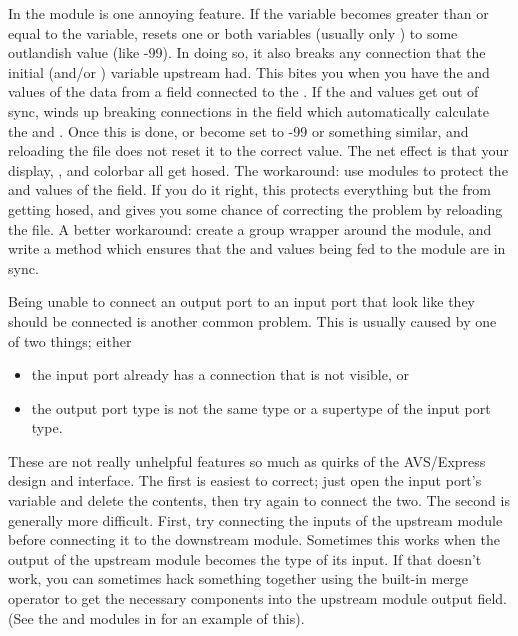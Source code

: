 In the  module is one annoying feature.  If the 
variable becomes greater than or equal to the  variable,
 resets one or both variables (usually only ) to some
outlandish value (like -99).  In doing so, it also breaks any connection that
the initial  (and/or ) variable upstream had.  This bites
you when you have the  and  values of the data from a
field connected to the .  If the  and 
values get out of sync,  winds up breaking connections in the
field which automatically calculate the  and .  Once this
is done,  or  become set to -99 or something similar, and
reloading the \parflow{} file does not reset it to the correct value.  The net
effect is that your display, , and colorbar all get hosed.  The
workaround:  use  modules to protect the  and
 values of the field.  If you do it right, this protects everything
but the  from getting hosed, and gives you some chance of
correcting the problem by reloading the \parflow{} file.  A better workaround:
create a group wrapper around the  module, and write a method
which ensures that the  and  values being fed to the
 module are in sync.

Being unable to connect an output port to an input port that look like they
should be connected is another common problem.  This is usually caused by one
of two things; either
\begin{itemize}
\item the input port already has a connection that is not visible, or
\item the output port type is not the same type or a supertype of the input port type.
\end{itemize}
These are not really unhelpful features so much as quirks of the AVS/Express
design and interface.  The first is easiest to correct; just open the input
port's variable and delete the contents, then try again to connect the two.
The second is generally more difficult.  First, try connecting the inputs of
the upstream module before connecting it to the downstream module.  Sometimes
this works when the output of the upstream module becomes the type of its
input.  If that doesn't work, you can sometimes hack something together using
the built-in merge operator to get the necessary components into the upstream
module output field.  (See the  and  modules in
 for an example of this).

